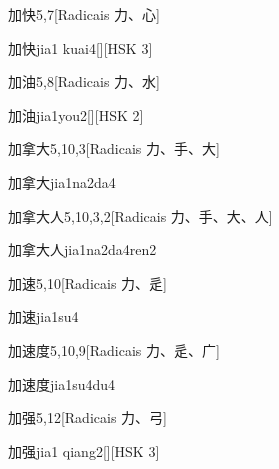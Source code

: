 \begin{entry}{加快}{5,7}[Radicais ⼒、⼼]
  \begin{phonetics}{加快}{jia1 kuai4}[][HSK 3]
  \end{phonetics}
\end{entry}

\begin{entry}{加油}{5,8}[Radicais ⼒、⽔]
  \begin{phonetics}{加油}{jia1you2}[][HSK 2]
  \end{phonetics}
\end{entry}

\begin{entry}{加拿大}{5,10,3}[Radicais ⼒、⼿、⼤]
  \begin{phonetics}{加拿大}{jia1na2da4}
  \end{phonetics}
\end{entry}

\begin{entry}{加拿大人}{5,10,3,2}[Radicais ⼒、⼿、⼤、⼈]
  \begin{phonetics}{加拿大人}{jia1na2da4ren2}
  \end{phonetics}
\end{entry}

\begin{entry}{加速}{5,10}[Radicais ⼒、⾡]
  \begin{phonetics}{加速}{jia1su4}
  \end{phonetics}
\end{entry}

\begin{entry}{加速度}{5,10,9}[Radicais ⼒、⾡、⼴]
  \begin{phonetics}{加速度}{jia1su4du4}
  \end{phonetics}
\end{entry}

\begin{entry}{加强}{5,12}[Radicais ⼒、⼸]
  \begin{phonetics}{加强}{jia1 qiang2}[][HSK 3]
  \end{phonetics}
\end{entry}

